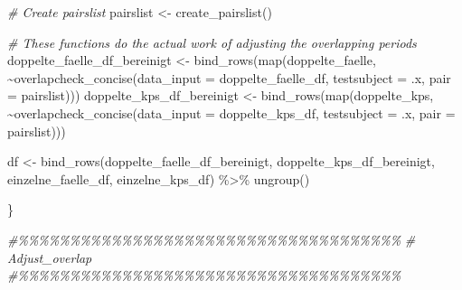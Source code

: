\documentclass[
]{article}
\newenvironment{Shaded}{\begin{snugshade}}{\end{snugshade}}
\newcommand{\AttributeTok}[1]{\textcolor[rgb]{0.77,0.63,0.00}{#1}}
\newcommand{\CommentTok}[1]{\textcolor[rgb]{0.56,0.35,0.01}{\textit{#1}}}
\newcommand{\FunctionTok}[1]{\textcolor[rgb]{0.00,0.00,0.00}{#1}}
\newcommand{\NormalTok}[1]{#1}
\newcommand{\OtherTok}[1]{\textcolor[rgb]{0.56,0.35,0.01}{#1}}
\newcommand{\SpecialCharTok}[1]{\textcolor[rgb]{0.00,0.00,0.00}{#1}}
\begin{document}
\begin{Shaded}
\begin{Highlighting}[]
  \CommentTok{\# Create pairslist}
\NormalTok{  pairslist }\OtherTok{\textless{}{-}} \FunctionTok{create\_pairslist}\NormalTok{()}
  
  \CommentTok{\# These functions do the actual work of adjusting the overlapping periods}
\NormalTok{  doppelte\_faelle\_df\_bereinigt }\OtherTok{\textless{}{-}} \FunctionTok{bind\_rows}\NormalTok{(}\FunctionTok{map}\NormalTok{(doppelte\_faelle, }\SpecialCharTok{\textasciitilde{}}\FunctionTok{overlapcheck\_concise}\NormalTok{(}\AttributeTok{data\_input =}\NormalTok{ doppelte\_faelle\_df, }\AttributeTok{testsubject =}\NormalTok{ .x, }\AttributeTok{pair =}\NormalTok{ pairslist)))}
\NormalTok{  doppelte\_kps\_df\_bereinigt }\OtherTok{\textless{}{-}} \FunctionTok{bind\_rows}\NormalTok{(}\FunctionTok{map}\NormalTok{(doppelte\_kps, }\SpecialCharTok{\textasciitilde{}}\FunctionTok{overlapcheck\_concise}\NormalTok{(}\AttributeTok{data\_input =}\NormalTok{ doppelte\_kps\_df, }\AttributeTok{testsubject =}\NormalTok{ .x, }\AttributeTok{pair =}\NormalTok{ pairslist)))}
  
\NormalTok{  df }\OtherTok{\textless{}{-}} \FunctionTok{bind\_rows}\NormalTok{(doppelte\_faelle\_df\_bereinigt, doppelte\_kps\_df\_bereinigt, einzelne\_faelle\_df, einzelne\_kps\_df) }\SpecialCharTok{\%\textgreater{}\%} \FunctionTok{ungroup}\NormalTok{()}

\NormalTok{\}}

\CommentTok{\#\%\%\%\%\%\%\%\%\%\%\%\%\%\%\%\%\%\%\%\%\%\%\%\%\%\%\%\%\%\%\%\%\%\%\%\%\%}
\CommentTok{\# Adjust\_overlap}
\CommentTok{\#\%\%\%\%\%\%\%\%\%\%\%\%\%\%\%\%\%\%\%\%\%\%\%\%\%\%\%\%\%\%\%\%\%\%\%\%\%}



\end{Highlighting}
\end{Shaded}
\end{document}

